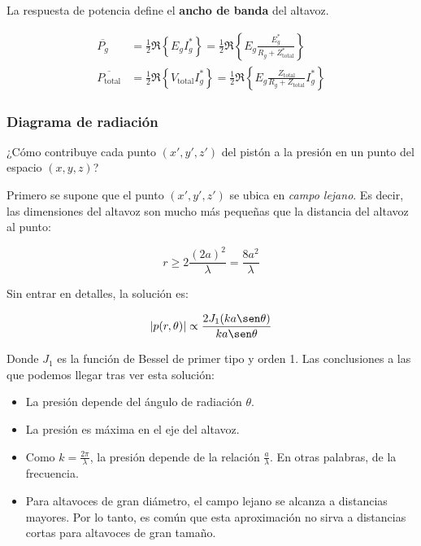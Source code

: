 \documentclass[12pt, a4paper]{article}
\begin{document}
La respuesta de potencia define el \textbf{ancho de banda} del altavoz.

\begin{align*}
  \overline{P_g}               & = \frac{1}{2} \Re \left\lbrace E_g I_g^* \right\rbrace = \frac{1}{2} \Re \left\lbrace E_g \frac{E_g^*}{R_g + Z^*_{\text{total}}} \right\rbrace                              \\
  \overline{P _{\text{total}}} & = \frac{1}{2} \Re \left\lbrace V _{\text{total}} I_g^* \right\rbrace = \frac{1}{2} \Re \left\lbrace E_g \frac{Z_{\text{total}}}{R_g + Z_{\text{total}}} I_g^* \right\rbrace
\end{align*}

\subsubsection{Diagrama de radiación}

¿Cómo contribuye cada punto $\left( x', y', z' \right)$ del pistón a la presión en un punto del espacio $\left( x, y, z \right)$?

Primero se supone que el punto $\left( x', y', z' \right)$ se ubica en \textit{campo lejano}. Es decir, las dimensiones del altavoz son mucho más pequeñas que la distancia del altavoz al punto:

\begin{equation} \label{eq:campo_lejano}
  r \geq 2 \frac{\left( 2a \right)^2}{\lambda} = \frac{8a^2}{\lambda}
\end{equation}

Sin entrar en detalles, la solución es:

\begin{equation} \label{eq:presion_punto}
  \abs{p(r,\theta)} \propto \frac{2 J_1(ka \sen \theta)}{ka \sen \theta}
\end{equation}

Donde $J_1$ es la función de Bessel de primer tipo y orden 1. Las conclusiones a las que podemos llegar tras ver esta solución:

\begin{itemize}
  \item La presión depende del ángulo de radiación $\theta$.
  \item La presión es máxima en el eje del altavoz.
  \item Como $k= \frac{2\pi}{\lambda}$, la presión depende de la relación $\frac{a}{\lambda}$. En otras palabras, de la frecuencia.
  \item Para altavoces de gran diámetro, el campo lejano se alcanza a distancias mayores. Por lo tanto, es común que esta aproximación no sirva a distancias cortas para altavoces de gran tamaño.
\end{itemize}
\end{document}
